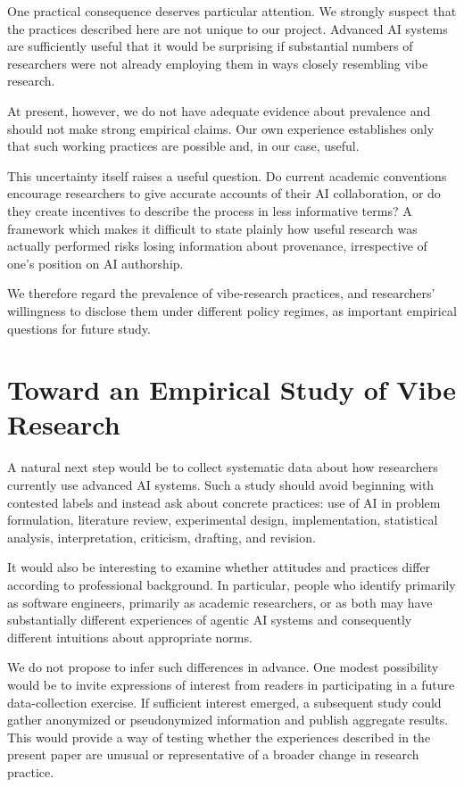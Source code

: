 One practical consequence deserves particular attention. We strongly suspect that the practices described here are not unique to our project. Advanced AI systems are sufficiently useful that it would be surprising if substantial numbers of researchers were not already employing them in ways closely resembling vibe research.

At present, however, we do not have adequate evidence about prevalence and should not make strong empirical claims. Our own experience establishes only that such working practices are possible and, in our case, useful.

This uncertainty itself raises a useful question. Do current academic conventions encourage researchers to give accurate accounts of their AI collaboration, or do they create incentives to describe the process in less informative terms? A framework which makes it difficult to state plainly how useful research was actually performed risks losing information about provenance, irrespective of one's position on AI authorship.

We therefore regard the prevalence of vibe-research practices, and researchers' willingness to disclose them under different policy regimes, as important empirical questions for future study.


\section{Toward an Empirical Study of Vibe Research}

A natural next step would be to collect systematic data about how researchers currently use advanced AI systems. Such a study should avoid beginning with contested labels and instead ask about concrete practices: use of AI in problem formulation, literature review, experimental design, implementation, statistical analysis, interpretation, criticism, drafting, and revision.

It would also be interesting to examine whether attitudes and practices differ according to professional background. In particular, people who identify primarily as software engineers, primarily as academic researchers, or as both may have substantially different experiences of agentic AI systems and consequently different intuitions about appropriate norms.

We do not propose to infer such differences in advance. One modest possibility would be to invite expressions of interest from readers in participating in a future data-collection exercise. If sufficient interest emerged, a subsequent study could gather anonymized or pseudonymized information and publish aggregate results. This would provide a way of testing whether the experiences described in the present paper are unusual or representative of a broader change in research practice.


